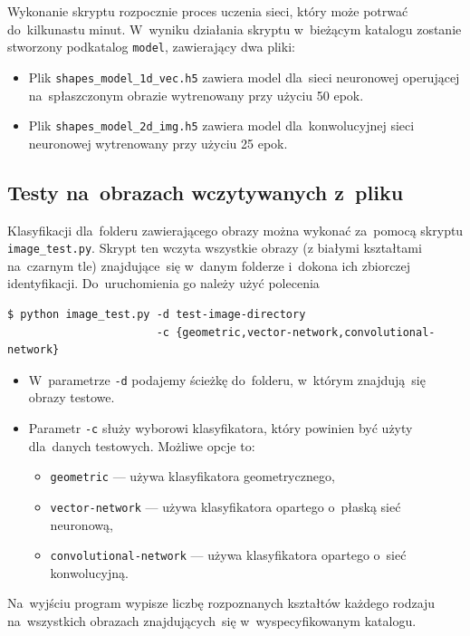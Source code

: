 \documentclass[11pt,a4paper]{article}
\begin{document}
Wykonanie skryptu rozpocznie proces uczenia sieci, który może potrwać do~kilkunastu minut.
W~wyniku działania skryptu w~bieżącym katalogu zostanie stworzony podkatalog \verb+model+, zawierający dwa pliki:

\begin{itemize}
    \item Plik \verb+shapes_model_1d_vec.h5+ zawiera model dla~sieci neuronowej operującej na~spłaszczonym obrazie wytrenowany przy użyciu 50 epok.
    \item Plik \verb+shapes_model_2d_img.h5+ zawiera model dla~konwolucyjnej sieci neuronowej wytrenowany przy użyciu 25 epok.
\end{itemize}

\subsection{Testy na~obrazach wczytywanych z~pliku}

Klasyfikacji dla~folderu zawierającego obrazy można wykonać za~pomocą skryptu \verb+image_test.py+.
Skrypt ten wczyta wszystkie obrazy (z białymi kształtami na~czarnym tle) znajdujące~się w~danym folderze i~dokona ich zbiorczej identyfikacji.
Do~uruchomienia go należy użyć polecenia
\begin{verbatim}
$ python image_test.py -d test-image-directory
                       -c {geometric,vector-network,convolutional-network}
\end{verbatim}

\begin{itemize}
    \item W~parametrze \verb+-d+ podajemy ścieżkę do~folderu, w~którym znajdują~się obrazy testowe.
    \item Parametr \verb+-c+ służy wyborowi klasyfikatora, który powinien być użyty dla~danych testowych.
    Możliwe opcje to:
    \begin{itemize}
        \item \verb+geometric+ --- używa klasyfikatora geometrycznego,
        \item \verb+vector-network+ --- używa klasyfikatora opartego o~płaską sieć neuronową,
        \item \verb+convolutional-network+ --- używa klasyfikatora opartego o~sieć konwolucyjną.
    \end{itemize}
\end{itemize}

Na~wyjściu program wypisze liczbę rozpoznanych kształtów każdego rodzaju na~wszystkich obrazach znajdujących~się w~wyspecyfikowanym katalogu.
\end{document}
